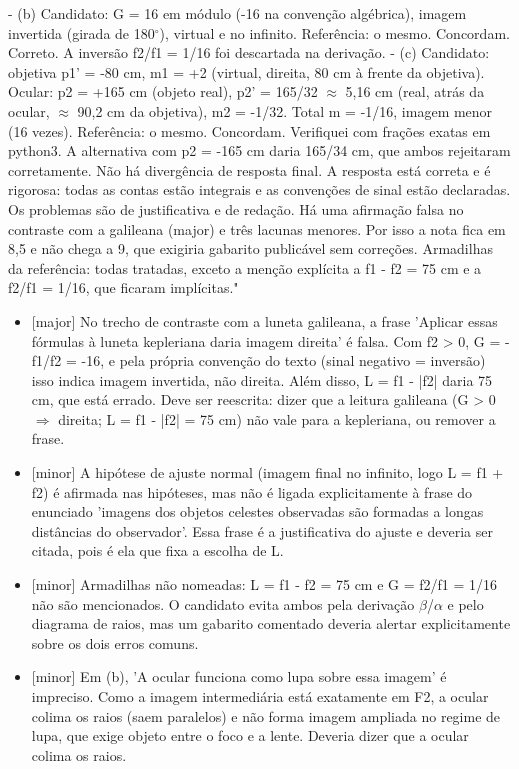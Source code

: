 \documentclass{article}%
\begin{document}
{-} (b) Candidato: G = 16 em módulo (-16 na convenção algébrica), imagem invertida (girada de 180$^\circ$), virtual e no infinito. Referência: o mesmo. Concordam. Correto. A inversão f2/f1 = 1/16 foi descartada na derivação.\newline%
{-} (c) Candidato: objetiva p1' = -80 cm, m1 = +2 (virtual, direita, 80 cm à frente da objetiva). Ocular: p2 = +165 cm (objeto real), p2' = 165/32 $\approx$ 5,16 cm (real, atrás da ocular, $\approx$ 90,2 cm da objetiva), m2 = -1/32. Total m = -1/16, imagem menor (16 vezes). Referência: o mesmo. Concordam. Verifiquei com frações exatas em python3. A alternativa com p2 = -165 cm daria 165/34 cm, que ambos rejeitaram corretamente.\newline%
\newline%
Não há divergência de resposta final. A resposta está correta e é rigorosa: todas as contas estão integrais e as convenções de sinal estão declaradas. Os problemas são de justificativa e de redação. Há uma afirmação falsa no contraste com a galileana (major) e três lacunas menores. Por isso a nota fica em 8,5 e não chega a 9, que exigiria gabarito publicável sem correções.\newline%
\newline%
Armadilhas da referência: todas tratadas, exceto a menção explícita a f1 - f2 = 75 cm e a f2/f1 = 1/16, que ficaram implícitas."%
\begin{itemize}%
\item%
{[}major{]} No trecho de contraste com a luneta galileana, a frase 'Aplicar essas fórmulas à luneta kepleriana daria imagem direita' é falsa. Com f2 > 0, G = -f1/f2 = -16, e pela própria convenção do texto (sinal negativo = inversão) isso indica imagem invertida, não direita. Além disso, L = f1 - |f2| daria 75 cm, que está errado. Deve ser reescrita: dizer que a leitura galileana (G > 0 $\Rightarrow$ direita; L = f1 - |f2| = 75 cm) não vale para a kepleriana, ou remover a frase.%
\item%
{[}minor{]} A hipótese de ajuste normal (imagem final no infinito, logo L = f1 + f2) é afirmada nas hipóteses, mas não é ligada explicitamente à frase do enunciado 'imagens dos objetos celestes observadas são formadas a longas distâncias do observador'. Essa frase é a justificativa do ajuste e deveria ser citada, pois é ela que fixa a escolha de L.%
\item%
{[}minor{]} Armadilhas não nomeadas: L = f1 - f2 = 75 cm e G = f2/f1 = 1/16 não são mencionados. O candidato evita ambos pela derivação $\beta$/$\alpha$ e pelo diagrama de raios, mas um gabarito comentado deveria alertar explicitamente sobre os dois erros comuns.%
\item%
{[}minor{]} Em (b), 'A ocular funciona como lupa sobre essa imagem' é impreciso. Como a imagem intermediária está exatamente em F2, a ocular colima os raios (saem paralelos) e não forma imagem ampliada no regime de lupa, que exige objeto entre o foco e a lente. Deveria dizer que a ocular colima os raios.%
\end{itemize}%
\end{document}
